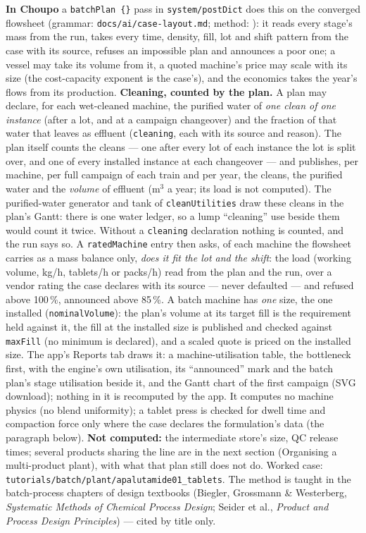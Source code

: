 \documentclass[11pt,a4paper]{article}
\begin{document}
\textbf{In Choupo} a \texttt{batchPlan \{\}} pass in
\texttt{system/postDict} does this on the converged flowsheet (grammar:
\texttt{docs/ai/case-layout.md}; method:
): it reads every stage's mass
from the run, takes every time, density, fill, lot and shift pattern
from the case with its source, refuses an impossible plan and announces
a poor one; a vessel may take its volume from it, a quoted machine's
price may scale with its size (the cost-capacity exponent is the
case's), and the economics takes the year's flows from its production.
\textbf{Cleaning, counted by the plan.} A plan may declare, for each
wet-cleaned machine, the purified water of \emph{one clean of one instance}
(after a lot, and at a campaign changeover) and the fraction of that water that
leaves as effluent (\texttt{cleaning}, each with its source and reason). The
plan itself counts the cleans --- one after every lot of each instance the lot
is split over, and one of every installed instance at each changeover --- and
publishes, per machine, per full campaign of each train and per year, the
cleans, the purified water and the \emph{volume} of effluent (m$^3$ a year;
its load is not computed). The purified-water generator and tank of
\texttt{cleanUtilities} draw these cleans in the plan's Gantt: there is one
water ledger, so a lump ``cleaning'' use beside them would count it twice.
Without a \texttt{cleaning} declaration nothing is counted, and the run says so.
A \texttt{ratedMachine} entry then asks, of each machine the flowsheet
carries as a mass balance only, \emph{does it fit the lot and the
shift}: the load (working volume, kg/h, tablets/h or packs/h) read from
the plan and the run, over a vendor rating the case declares with its
source --- never defaulted --- and refused above 100\,\%, announced
above 85\,\%. A batch machine has \emph{one} size, the one installed
(\texttt{nominalVolume}): the plan's volume at its target fill is the
requirement held against it, the fill at the installed size is published and
checked against \texttt{maxFill} (no minimum is declared), and a scaled quote
is priced on the installed size. The app's Reports tab draws it: a machine-utilisation table,
the bottleneck first, with the engine's own utilisation, its ``announced''
mark and the batch plan's stage utilisation beside it, and the Gantt chart of
the first campaign (SVG download); nothing in it is recomputed by the app. It
computes no machine physics (no blend uniformity); a tablet press is checked
for dwell time and compaction force only where the case declares the
formulation's data (the paragraph below). \textbf{Not computed:} the intermediate store's
size, QC release times; several products sharing the line are in the
next section (Organising a multi-product plant), with what that plan
still does not do. Worked case:
\texttt{tutorials/batch/plant/apalutamide01\_tablets}. The method is taught in
the batch-process chapters of design textbooks (Biegler, Grossmann \&
Westerberg, \emph{Systematic Methods of Chemical Process Design}; Seider
et al., \emph{Product and Process Design Principles}) --- cited by title
only.
\end{document}
